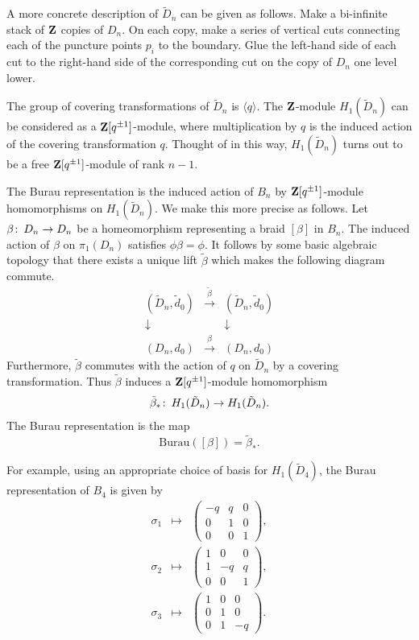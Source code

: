 \documentclass[10pt]{amsart}
\theoremstyle{plain}
\theoremstyle{definition}
\newcommand{\Z}{{\bf{Z}}}
\newcommand{\Burau}{{\mathrm{Burau}}}
\newcommand{\co}{\colon\thinspace}
\begin{document}
A more concrete description of $\tilde{D}_n$
can be given as follows.
Make a bi-infinite stack of $\Z$ copies of $D_n$.
On each copy, make a series of vertical cuts
connecting each of the puncture points $p_i$ to the boundary.
Glue the left-hand side of each cut
to the right-hand side of the corresponding cut
on the copy of $D_n$ one level lower.

The group of covering transformations of $\tilde{D}_n$
is $\langle q \rangle$.
The $\Z$-module $H_1(\tilde{D}_n)$
can be considered as a $\Z[q^{\pm 1}]$-module,
where multiplication by $q$
is the induced action of the covering transformation $q$.
Thought of in this way,
$H_1(\tilde{D}_n)$ turns out to be
a free $\Z[q^{\pm 1}]$-module of rank $n-1$.

The Burau representation
is the induced action of $B_n$
by $\Z[q^{\pm 1}]$-module homomorphisms
on $H_1(\tilde{D}_n)$.
We make this more precise as follows.
Let $\beta \co D_n \rightarrow D_n$ be a homeomorphism
representing a braid $[\beta]$ in $B_n$.
The induced action of $\beta$ on $\pi_1(D_n)$
satisfies $\phi \beta = \phi$.
It follows by some basic algebraic topology
that there exists a unique lift $\tilde{\beta}$
which makes the following diagram commute.
$$
\begin{array}{ccc}
(\tilde{D}_n,\tilde{d}_0)
  & \stackrel{\tilde{\beta}}{\rightarrow} 
  & (\tilde{D}_n,\tilde{d}_0) \\
\downarrow  &                               & \downarrow \\
(D_n,d_0)   & \stackrel{\beta}{\rightarrow} & (D_n,d_0)
\end{array}
$$
Furthermore, $\tilde{\beta}$ commutes with
the action of $q$ on $\tilde{D}_n$ by a covering transformation.
Thus $\tilde{\beta}$ induces a $\Z[q^{\pm 1}]$-module homomorphism
$$
\tilde{\beta}_* \co H_1(\tilde{D}_n) \rightarrow H_1(\tilde{D}_n).
$$
The Burau representation is the map
$$\Burau([\beta]) = \tilde{\beta}_*.$$

For example,
using an appropriate choice of basis for $H_1(\tilde{D}_4)$,
the Burau representation of $B_4$ is given by
\begin{eqnarray*}
\sigma_1 &\mapsto&
\left( \begin{array}{ccc} -q&q&0\\0&1&0\\0&0&1 \end{array} \right),
\\
\sigma_2 &\mapsto&
\left( \begin{array}{ccc} 1&0&0\\1&-q&q\\0&0&1 \end{array} \right),
\\
\sigma_3 &\mapsto&
\left( \begin{array}{ccc} 1&0&0\\0&1&0\\0&1&-q \end{array} \right).
\end{eqnarray*}
\end{document}
